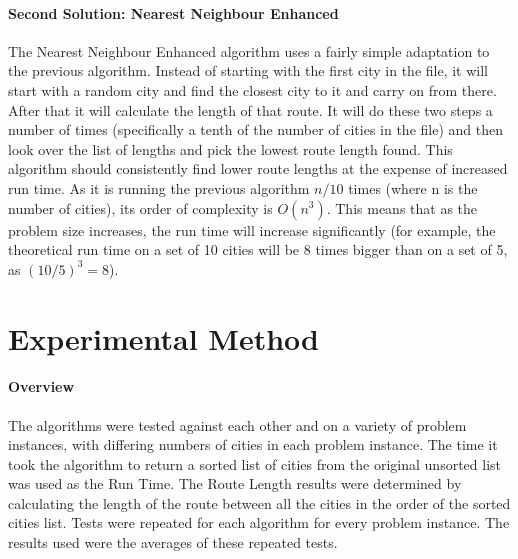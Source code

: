 \documentclass[conference,backref=page]{acmsiggraph}
\begin{document}
\paragraph{Second Solution: Nearest Neighbour Enhanced}
The Nearest Neighbour Enhanced algorithm uses a fairly simple adaptation to the previous algorithm. Instead of starting with the first city in the file, it will start with a random city and find the closest city to it and carry on from there. After that it will calculate the length of that route. It will do these two steps a number of times (specifically a tenth of the number of cities in the file) and then look over the list of lengths and pick the lowest route length found. This algorithm should consistently find lower route lengths at the expense of increased run time. As it is running the previous algorithm $n/10$ times (where n is the number of cities), its order of complexity is $O(n^3)$. This means that as the problem size increases, the run time will increase significantly (for example, the theoretical run time on a set of 10 cities will be 8 times bigger than on a set of 5, as $(10/5)^3 = 8$).


\section{Experimental Method}

\paragraph{Overview}
The algorithms were tested against each other and on a variety of problem instances, with differing numbers of cities in each problem instance. The time it took the algorithm to return a sorted list of cities from the original unsorted list was used as the Run Time. The Route Length results were determined by calculating the length of the route between all the cities in the order of the sorted cities list. Tests were repeated for each algorithm for every problem instance. The results used were the averages of these repeated tests.
\end{document}

